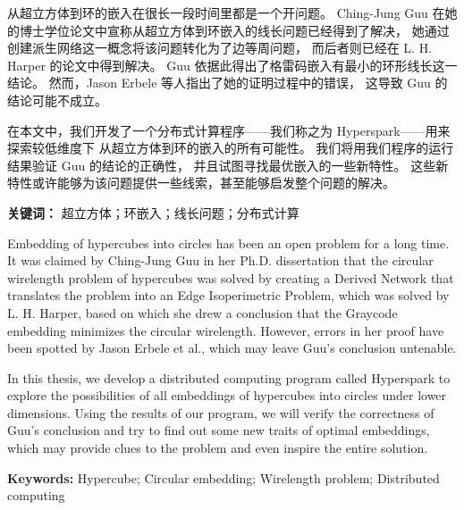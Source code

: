 
\label{Abstract CN}

从超立方体到环的嵌入在很长一段时间里都是一个开问题。
Ching-Jung Guu 在她的博士学位论文中宣称从超立方体到环嵌入的线长问题已经得到了解决，
她通过创建派生网络这一概念将该问题转化为了边等周问题，
而后者则已经在 L. H. Harper 的论文中得到解决。
Guu 依据此得出了格雷码嵌入有最小的环形线长这一结论。
然而，Jason Erbele 等人指出了她的证明过程中的错误，
这导致 Guu 的结论可能不成立。

在本文中，我们开发了一个分布式计算程序——我们称之为 Hyperspark——用来探索较低维度下
从超立方体到环的嵌入的所有可能性。
我们将用我们程序的运行结果验证 Guu 的结论的正确性，
并且试图寻找最优嵌入的一些新特性。
这些新特性或许能够为该问题提供一些线索，甚至能够启发整个问题的解决。
\hfill\break

\textbf{关键词：} 超立方体；环嵌入；线长问题；分布式计算

\label{Abstract EN}

Embedding of hypercubes into circles has been an open problem for a long time.
It was claimed by Ching-Jung Guu in her Ph.D. dissertation that
the circular wirelength problem of hypercubes was solved by creating a Derived
Network that translates the problem into an Edge Isoperimetric Problem,
which was solved by L. H. Harper, based on which
she drew a conclusion that the Graycode embedding minimizes the circular wirelength.
However, errors in her proof have been spotted by Jason Erbele et al.,
which may leave Guu's conclusion untenable.

In this thesis, we develop a distributed computing program called Hyperspark to
explore the possibilities of all embeddings of hypercubes into circles under lower dimensions.
Using the results of our program, we will verify the correctness of Guu's conclusion
and try to find out some new traits of optimal embeddings,
which may provide clues to the problem and even inspire the entire solution.
\hfill\break

\textbf{Keywords:} Hypercube; Circular embedding; Wirelength problem;
Distributed computing
